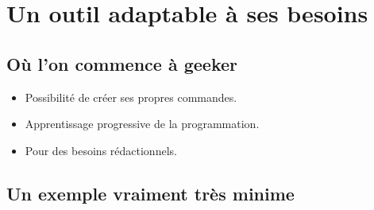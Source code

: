 \section[Adapter]{Un outil adaptable à ses besoins}

\subsection{Où l'on commence à geeker}

\begin{frame}
  \begin{itemize}
    \item Possibilité de créer ses propres commandes.
    \item Apprentissage progressive de la programmation.
    \item Pour des besoins rédactionnels.
  \end{itemize}
\end{frame}

\subsection{Un exemple vraiment très minime}
\begin{frame}
  \renewcommand{\index}[2][]{}
  \beamerdefaultoverlayspecification{}
  \inputminted{latex}{examples/prog.tex}
  
\end{frame}
